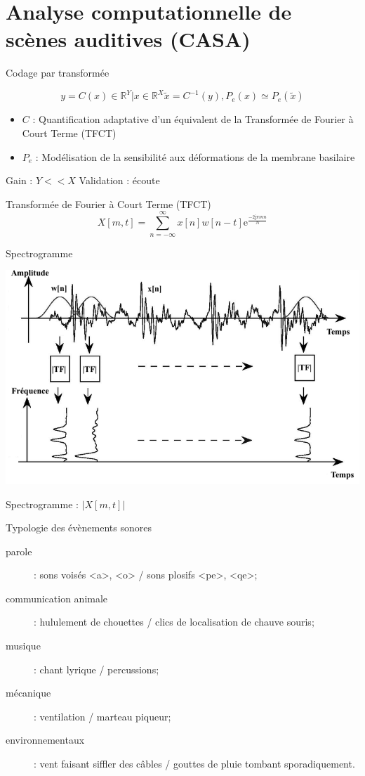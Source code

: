\section[CASA]{Analyse computationnelle de scènes auditives (CASA)}

\begin{frame}{Codage par transformée}

$$y = C(x) \in \mathbb{R}^Y | x \in \mathbb{R}^{X} \tilde{x} = C^{-1}(y), P_e(x) \simeq P_e(\tilde{x})$$
\begin{itemize}
\item $C$ : Quantification adaptative d'un équivalent de la Transformée de Fourier à Court Terme (TFCT)
\item $P_e$ : Modélisation de la sensibilité aux déformations de la membrane basilaire
\end{itemize}
Gain : $Y<<X$
Validation : écoute
\end{frame}

\begin{frame}{Transformée de Fourier à Court Terme (TFCT)}
$$ X[m, t] = \sum_{n = - \infty}^{\infty} x[n] w[n-t] \mathrm{e}^{\frac{-2 \mathrm{j}  \pi m n}{N}} $$
\end{frame}

\begin{frame}{Spectrogramme}
\begin{center}
\includegraphics[width=.8\columnwidth]{figures/tfct} \\
\end{center}
Spectrogramme : $|X[m, t]|$
\end{frame}

\begin{frame}{Typologie des évènements sonores}
\begin{description}
  \item[parole] : sons voisés <a>, <o> / sons plosifs <pe>, <qe>;
  \item[communication animale] : hululement de chouettes / clics de localisation de chauve souris;
  \item[musique] : chant lyrique / percussions;
  \item[mécanique] : ventilation / marteau piqueur;
  \item[environnementaux] : vent faisant siffler des câbles / gouttes de pluie tombant sporadiquement.
\end{description}
\end{frame}

